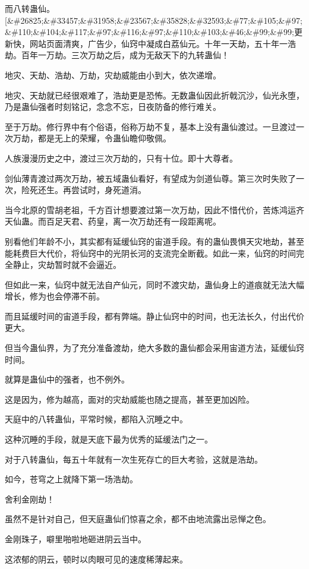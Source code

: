 \begin{this_body}
而八转蛊仙。[\&\#26825;\&\#33457;\&\#31958;\&\#23567;\&\#35828;\&\#32593;\&\#77;\&\#105;\&\#97;\&\#110;\&\#104;\&\#117;\&\#97;\&\#116;\&\#97;\&\#110;\&\#103;\&\#46;\&\#99;\&\#99;更新快，网站页面清爽，广告少，仙窍中凝成白荔仙元。十年一天劫，五十年一浩劫。百年一万劫。三次万劫之后，成为无敌天下的九转蛊仙！

地灾、天劫、浩劫、万劫，灾劫威能由小到大，依次递增。

地灾、天劫就已经很艰难了，浩劫更是恐怖。无数蛊仙因此折戟沉沙，仙光永堕，乃是蛊仙强者时刻铭记，念念不忘，日夜防备的修行难关。

至于万劫。修行界中有个俗语，俗称万劫不复，基本上没有蛊仙渡过。一旦渡过一次万劫，都是无上的荣耀，令蛊仙瞻仰敬佩。

人族漫漫历史之中，渡过三次万劫的，只有十位。即十大尊者。

剑仙薄青渡过两次万劫，被五域蛊仙看好，有望成为剑道仙尊。第三次时失败了一次，险死还生。再尝试时，身死道消。

当今北原的雪胡老祖，千方百计想要渡过第一次万劫，因此不惜代价，苦炼鸿运齐天仙蛊。而百足天君、药皇，离一次万劫还有一段距离呢。

别看他们年龄不小，其实都有延缓仙窍的宙道手段。有的蛊仙畏惧天灾地劫，甚至能耗费巨大代价，将仙窍中的光阴长河的支流完全断截。如此一来，仙窍的时间完全静止，灾劫暂时就不会逼近。

但如此一来，仙窍中就无法自产仙元，同时不渡灾劫，蛊仙身上的道痕就无法大幅增长，修为也会停滞不前。

而且延缓时间的宙道手段，都有弊端。静止仙窍中的时间，也无法长久，付出代价更大。

但当今蛊仙界，为了充分准备渡劫，绝大多数的蛊仙都会采用宙道方法，延缓仙窍时间。

就算是蛊仙中的强者，也不例外。

这是因为，修为越高，面对的灾劫威能也随之提高，甚至更加凶险。

天庭中的八转蛊仙，平常时候，都陷入沉睡之中。

这种沉睡的手段，就是天底下最为优秀的延缓法门之一。

对于八转蛊仙，每五十年就有一次生死存亡的巨大考验，这就是浩劫。

如今，苍穹之上就降下第一场浩劫。

舍利金刚劫！

虽然不是针对自己，但天庭蛊仙们惊喜之余，都不由地流露出忌惮之色。

金刚珠子，噼里啪啦地砸进阴云当中。

这浓郁的阴云，顿时以肉眼可见的速度稀薄起来。


\end{this_body}
